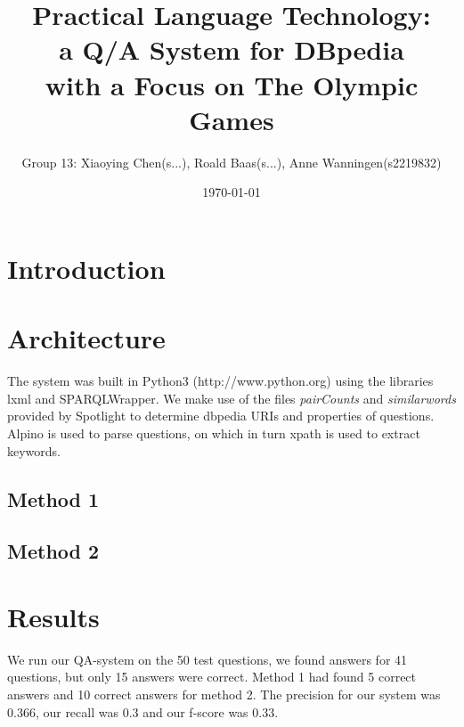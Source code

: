 \documentclass[a4paper,11pt]{article}
\title{ {\small Practical Language Technology:}\\{\Large a Q/A System for DBpedia}\\{\small with a Focus on The Olympic Games}}
\date{\today}
\author{
  {\small Group 13: }
  {\small Xiaoying Chen}{\tiny(s...)},
  {\small Roald Baas}{\tiny(s...)},
  {\small Anne Wanningen}{\tiny(s2219832)}
}
\begin{document}


\maketitle

\section{Introduction}



\section{Architecture}
The system was built in Python3 (http://www.python.org) using the libraries lxml and SPARQLWrapper. We make use of the files \emph{pairCounts} and \emph{similarwords} provided by Spotlight \citep{isem2013daiber} to determine dbpedia URIs and properties of questions. Alpino is used to parse questions, on which in turn xpath is used to extract keywords.



\subsection{Method 1}


\subsection{Method 2}



\section{Results}
We run our QA-system on the 50 test questions, we found answers for 41 questions, but only 15 answers were correct. Method 1 had found 5 correct answers and 10 correct answers for method 2. The precision for our system was 0.366, our recall was 0.3 and our f-score was 0.33.
\end{document}
